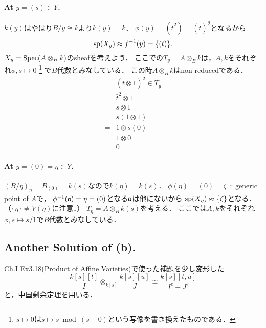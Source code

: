 \documentclass[a4paper]{jsarticle}
\newcommand{\basesp}{\operatorname{sp}}
\begin{document}
    \paragraph{At $y=(s) \in Y$.}
    $k(y)$はやはり$B/y \cong k$より$k(y)=k$．
    $\phi(y)=(\bar{t}^2)=(\bar{t})^2$となるから
    \[ \basesp(X_y) \homeo f^{-1}(y)=\{ (\bar{t}) \}. \]
    $X_y=\operatorname{Spec} (A \otimes_B k)$のsheafを考えよう．
    ここでの$T_y=A \otimes_B k$は，$A,k$をそれぞれ$\phi, s \mapsto 0$
    \footnote{$s \mapsto 0$は$s \mapsto s \bmod (s-0)$という写像を書き換えたものである．}
    で$B$代数とみなしている．
    この時$A \otimes_B k$はnon-reducedである．
    \begin{align*}
        {}  & (\bar{t} \otimes 1)^2 \in T_y \\
        =   & \bar{t}^2 \otimes 1 \\
        =   & \bar{s} \otimes 1 \\
        =   & s(1 \otimes 1) \\
        =   & 1 \otimes s(0) \\
        =   & 1 \otimes 0 \\
        =   & 0
    \end{align*}

    \paragraph{At $y=(0)=\eta \in Y$.}
    $(B/\eta)_{\eta}=B_{(0)}=k(s)$なので$k(\eta)=k(s)$．
    $\phi(\eta)=(0)=\zeta$ :: generic point of $A$で，
    $\phi^{-1}(\mathfrak{a})=\eta=(0)$となる$\mathfrak{a}$は他にないから
    $\basesp(X_{\eta}) \homeo \{\zeta\}$となる．
    （$\{\eta\} \neq V(\eta)$に注意．）
    $T_{\eta}=A \otimes_B k(s)$を考える．
    ここでは$A,k$をそれぞれ$\phi, s \mapsto s/1$で$B$代数とみなしている．

    \subsection{Another Solution of (b).}
    Ch.I Ex3.18(Product of Affine Varieties)で使った補題を少し変形した
    \[ \frac{k[s][t]}{I} \otimes_{k[s]} \frac{k[s][u]}{J} \cong \frac{k[s][t,u]}{I^e+J^e} \]
    と，中国剰余定理を用いる．
\end{document}
